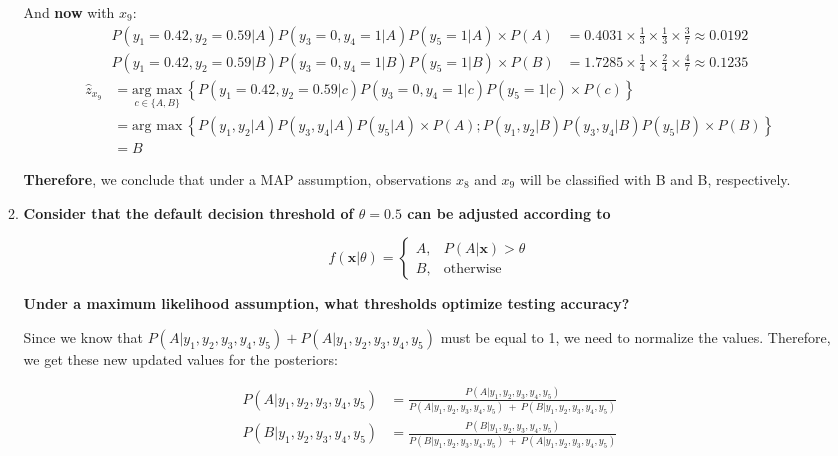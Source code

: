 \documentclass[12pt]{article}
\begin{document}
\begin{enumerate}[leftmargin=\labelsep]
\begin{enumerate}
          And \textbf{now} with $x_9$:
          $$
              \begin{aligned}
                  P(y_1 = 0.42, y_2 = 0.59 | A) P(y_3 = 0, y_4 = 1 | A) P(y_5 = 1 | A) \times P(A) & = 0.4031 \times \frac{1}{3} \times \frac{1}{3} \times \frac{3}{7} \approx 0.0192 \\
                  P(y_1 = 0.42, y_2 = 0.59 | B) P(y_3 = 0, y_4 = 1 | B) P(y_5 = 1 | B) \times P(B) & = 1.7285 \times \frac{1}{4} \times \frac{2}{4} \times \frac{4}{7} \approx 0.1235
              \end{aligned}
          $$
          $$
              \begin{aligned}
                  \hat{z}_{x_9} & = \underset{c \in \{A, B\}}{\text{arg max}} \medspace \left\{P(y_1 = 0.42, y_2 = 0.59 | c) P(y_3 = 0, y_4 = 1 | c) P(y_5 = 1 | c) \times P(c)\right\}  \\
                          & = \text{arg max} \medspace \left\{P(y_1, y_2 | A) P(y_3, y_4 | A) P(y_5 | A) \times P(A); P(y_1, y_2 | B) P(y_3, y_4 | B) P(y_5 | B) \times P(B)\right\} \\
                          & = B
              \end{aligned}
          $$

          \textbf{Therefore}, we conclude that under a MAP assumption, observations $x_8$ and $x_9$ will be classified with B and B, respectively.

          \item \textbf{Consider that the default decision threshold of $\theta = 0.5$ can be adjusted according to}

                \[
                        f(\textbf{x}|\theta)=
                    \begin{cases}
                        A,& P(A|\textbf{x}) > \theta\\
                        B,& \text{otherwise}
                    \end{cases}
                \]

                \textbf{Under a maximum likelihood assumption, what thresholds optimize testing accuracy?}

          \vskip 0.3cm
          Since we know that $P(A|y_1, y_2, y_3, y_4, y_5) + P(A|y_1, y_2, y_3, y_4, y_5)$ must be equal to 1, we need to normalize the values.
          Therefore, we get these new updated values for the posteriors:

          \begin{equation}\label{exI1-c-N}
              \begin{aligned}
                  P(A|y_1, y_2, y_3, y_4, y_5) & = \frac{P(A|y_1, y_2, y_3, y_4, y_5)}{P(A|y_1, y_2, y_3, y_4, y_5) \ + \ P(B|y_1, y_2, y_3, y_4, y_5)} \\
                  P(B|y_1, y_2, y_3, y_4, y_5) & = \frac{P(B|y_1, y_2, y_3, y_4, y_5)}{P(B|y_1, y_2, y_3, y_4, y_5) \ + \ P(A|y_1, y_2, y_3, y_4, y_5)}
              \end{aligned}
          \end{equation}


\end{enumerate}
\end{enumerate}
\end{document}
